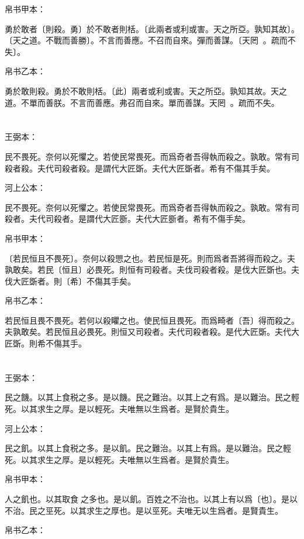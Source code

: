 \documentclass[a5paper]{ctexbook}
\begin{document}
    帛书甲本：

    勇於敢者〔則殺。勇〕於不敢者則栝。〔此兩者或利或害。天之所亞。孰知其故〕。〔天之道。不戰而善勝〕。不言而善應。不召而自來。彈而善謀。〔天罔𧙔𧙔。疏而不失〕。

    帛书乙本：

    勇於敢則殺。勇於不敢則栝。〔此〕兩者或利或害。天之所亞。孰知其故。天之道。不單而善朕。不言而善應。弗召而自來。單而善謀。天罔𧙔𧙔。疏而不失。

    \chapter{}
    王弼本：

    民不畏死。奈何以死懼之。若使民常畏死。而爲奇者吾得執而殺之。孰敢。常有司殺者殺。夫代司殺者殺。是謂代大匠斲。夫代大匠斲者。希有不傷其手矣。

    河上公本：

    民不畏死。奈何以死懼之。若使民常畏死。而爲奇者吾得執而殺之。孰敢。常有司殺者。夫代司殺者。是謂代大匠斵。夫代大匠斵者。希有不傷手矣。

    帛书甲本：

    〔若民恒且不畏死〕。奈何以殺愳之也。若民恒是死。則而爲者吾將得而殺之。夫孰敢矣。若民〔恒且〕必畏死。則恒有司殺者。夫伐司殺者殺。是伐大匠斲也。夫伐大匠斲者。則〔希〕不傷其手矣。

    帛书乙本：

    若民恒且畏不畏死。若何以殺䂂之也。使民恒且畏死。而爲畸者〔吾〕得而殺之。夫孰敢矣。若民恒且必畏死。則恒又司殺者。夫代司殺者殺。是代大匠斲。夫代大匠斲。則希不傷其手。

    \chapter{}
    王弼本：

    民之饑。以其上食税之多。是以饑。民之難治。以其上之有爲。是以難治。民之輕死。以其求生之厚。是以輕死。夫唯無以生爲者。是賢於貴生。

    河上公本：

    民之飢。以其上食税之多。是以飢。民之難治。以其上有爲。是以難治。民之輕死。以其求生之厚。是以輕死。夫唯無以生爲者。是賢於貴生。

    帛书甲本：

    人之飢也。以其取食𨓚之多也。是以飢。百姓之不治也。以其上有以爲〔也〕。是以不治。民之巠死。以其求生之厚也。是以巠死。夫唯无以生爲者。是賢貴生。

    帛书乙本：
\end{document}
